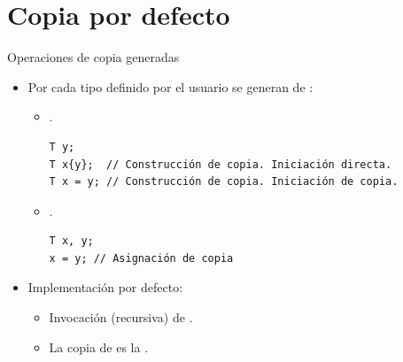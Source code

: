 \section{Copia por defecto}

\begin{frame}[fragile]{Operaciones de copia generadas}
\begin{itemize}
  \item Por cada tipo definido por el usuario se generan 
        de  :
    \begin{itemize}

      \item {}.
\begin{lstlisting}
T y;
T x{y};  // Construcción de copia. Iniciación directa.
T x = y; // Construcción de copia. Iniciación de copia.
\end{lstlisting}

      \item {}.
\begin{lstlisting}
T x, y;
x = y; // Asignación de copia
\end{lstlisting}
    \end{itemize}

  \item Implementación por defecto:
    \begin{itemize}
      \item Invocación (recursiva) de  
            .
      \item La copia de  es la 
            .
    \end{itemize}
\end{itemize}
\end{frame}


